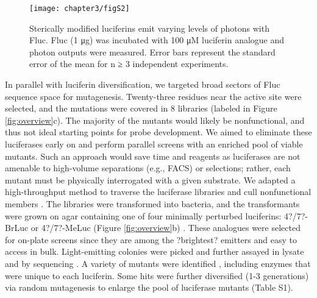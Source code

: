 \begin{figure}[htb]
\texttt{[image: chapter3/figS2]}
\centering
\caption[Sterically modified luciferins emit varying levels of photons with Fluc]{Sterically modified luciferins emit varying levels of photons with Fluc. Fluc (1 μg) was incubated with 100 μM luciferin analogue and photon outputs were measured. Error bars represent the standard error of the mean for n ≥ 3 independent experiments.}
  \label{fig:S2}
\end{figure}
\par
In parallel with luciferin diversification, we targeted broad sectors of Fluc sequence space for mutagenesis. Twenty-three residues near the active site were selected, and the mutations were covered in 8 libraries (labeled in Figure \ref{fig:overview}c). The majority of the mutants would likely be nonfunctional, and thus not ideal starting points for probe development. We aimed to eliminate these luciferases early on and perform parallel screens with an enriched pool of viable mutants. Such an approach would save time and reagents as luciferases are not amenable to high-volume separations (e.g., FACS) or selections; rather, each mutant must be physically interrogated with a given substrate. We adapted a high-throughput method to traverse the luciferase libraries and cull nonfunctional members
.\cite{Jones:2017be} The libraries were transformed into bacteria, and the transformants were grown on agar containing one of four minimally perturbed luciferins: 4?/7?-BrLuc or 4?/7?-MeLuc (Figure \ref{fig:overview}b)
. These analogues were selected for on-plate screens since they are among the ?brightest? emitters and easy to access in bulk. Light-emitting colonies were picked and further assayed in lysate and by sequencing
. A variety of mutants were identified
, including enzymes that were unique to each luciferin. Some hits were further diversified (1-3 generations) via random mutagenesis to enlarge the pool of luciferase mutants (Table S1). %

